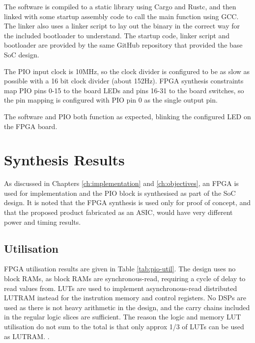 The software is compiled to a static library using Cargo and Rustc, and then linked with some startup assembly code to call the main function using GCC. The linker also uses a linker script to lay out the binary in the correct way for the included bootloader to understand. The startup code, linker script and bootloader are provided by the same GitHub repository that provided the base SoC design.

The PIO input clock is 10MHz, so the clock divider is configured to be as slow as possible with a 16 bit clock divider (about 152Hz). FPGA synthesis constraints map PIO pins 0-15 to the board LEDs and pins 16-31 to the board switches, so the pin mapping is configured with PIO pin 0 as the single output pin.

The software and PIO both function as expected, blinking the configured LED on the FPGA board.

\section{Synthesis Results}
As discussed in Chapters \ref{ch:implementation} and \ref{ch:objectives}, an FPGA is used for implementation and the PIO block is synthesised as part of the SoC design. It is noted that the FPGA synthesis is used only for proof of concept, and that the proposed product fabricated as an ASIC, would have very different power and timing results.

\subsection{Utilisation}
\label{sec:synth-res}

FPGA utilisation results are given in Table \ref{tab:pio-util}. The design uses no block RAMs, as block RAMs are synchronous-read, requiring a cycle of delay to read values from. LUTs are used to implement asynchronous-read distributed LUTRAM instead for the instrution memory and control registers. No DSPs are used as there is not heavy arithmetic in the design, and the carry chains included in the regular logic slices are sufficient. The reason the logic and memory LUT utilisation do not sum to the total is that only approx 1/3 of LUTs can be used as LUTRAM. \cite{clb_ug}.

